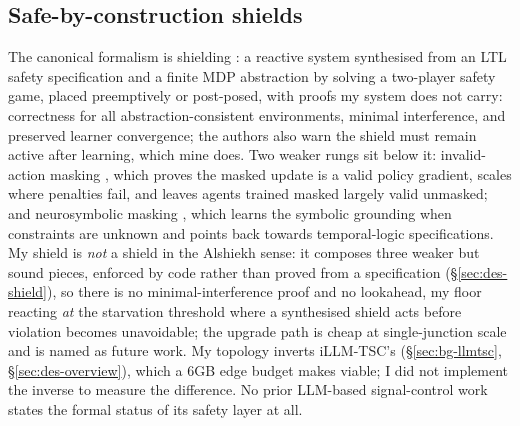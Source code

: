 \subsection{Safe-by-construction shields}\label{sec:bg-shields}

The canonical formalism is shielding \cite{alshiekh2018shield}: a reactive system synthesised from an LTL safety specification and a finite MDP abstraction by solving a two-player safety game, placed preemptively or post-posed, with proofs my system does not carry: correctness for all abstraction-consistent environments, minimal interference, and preserved learner convergence; the authors also warn the shield must remain active after learning, which mine does. Two weaker rungs sit below it: invalid-action masking \cite{huang2020masking}, which proves the masked update is a valid policy gradient, scales where penalties fail, and leaves agents trained masked largely valid unmasked; and neurosymbolic masking \cite{nsam2026}, which learns the symbolic grounding when constraints are unknown and points back towards temporal-logic specifications. My shield is \emph{not} a shield in the Alshiekh sense: it composes three weaker but sound pieces, enforced by code rather than proved from a specification (\S\ref{sec:des-shield}), so there is no minimal-interference proof and no lookahead, my floor reacting \emph{at} the starvation threshold where a synthesised shield acts before violation becomes unavoidable; the upgrade path is cheap at single-junction scale and is named as future work. My topology inverts iLLM-TSC's (\S\ref{sec:bg-llmtsc}, \S\ref{sec:des-overview}), which a 6GB edge budget makes viable; I did not implement the inverse to measure the difference. No prior LLM-based signal-control work states the formal status of its safety layer at all.
